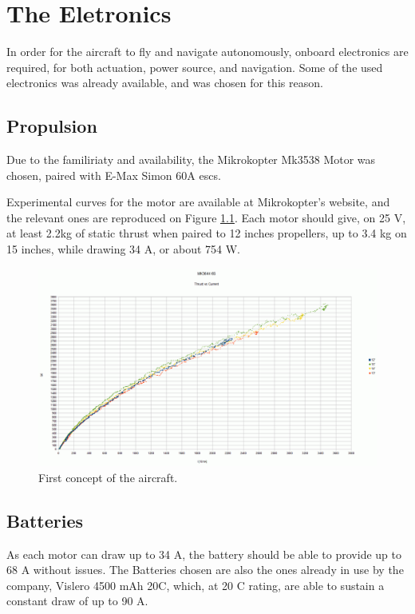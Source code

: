 
\chapter{The Eletronics} \label{chap:electronics}

In order for the aircraft to fly and navigate autonomously, onboard electronics are required, for both actuation, power source, and navigation. Some of the used electronics was already available, and was chosen for this reason.
	
\section{Propulsion}

Due to the familiriaty and availability, the Mikrokopter Mk3538 Motor was chosen, paired with E-Max Simon 60A escs.

Experimental curves for the motor are available at Mikrokopter's website, and the relevant ones are reproduced on Figure \ref{fig:motorcurves}. Each motor should give, on 25 V, at least 2.2kg of static thrust when paired to 12 inches propellers, up to 3.4 kg on 15 inches, while drawing 34 A, or about 754 W.
\begin{figure}
\centering
  \includegraphics[width=\linewidth]{figs/motorcurves.png}
  \caption{First concept of the aircraft.}
  \label{fig:motorcurves}
\end{figure}


\section{Batteries}

As each motor can draw up to 34 A, the battery should be able to provide up to 68 A without issues.
The Batteries chosen are also the ones already in use by the company, Vislero 4500 mAh 20C, which, at 20 C rating, are able to sustain a constant draw of up to 90 A. 

